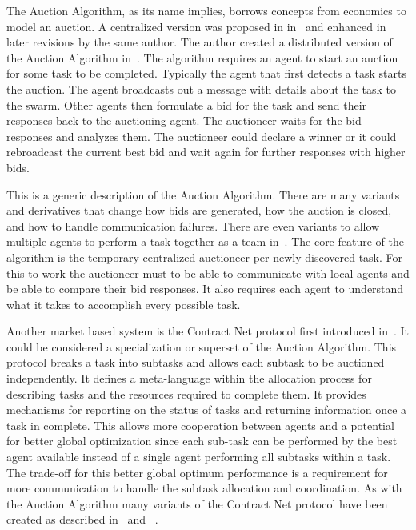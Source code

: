 The Auction Algorithm, as its name implies, borrows concepts from economics to model an auction.  A centralized version was proposed in in~\cite{auction_derive} and enhanced in later revisions by the same author.  The author created a distributed version of the Auction Algorithm in~\cite{auction_parallel}.  The algorithm requires an agent to start an auction for some task to be completed.  Typically the agent that first detects a task starts the auction.  The agent broadcasts out a message with details about the task to the swarm.  Other agents then formulate a bid for the task and send their responses back to the auctioning agent.  The auctioneer waits for the bid responses and analyzes them.  The auctioneer could declare a winner or it could rebroadcast the current best bid and wait again for further responses with higher bids.  

This is a generic description of the Auction Algorithm.  There are many variants and derivatives that change how bids are generated, how the auction is closed, and how to handle communication failures.  There are even variants to allow multiple agents to perform a task together as a team in~\cite{auction_team}.  The core feature of the algorithm is the temporary centralized auctioneer per newly discovered task.  For this to work the auctioneer must to be able to communicate with local agents and be able to compare their bid responses.  It also requires each agent to understand what it takes to accomplish every possible task.

Another market based system is the Contract Net protocol first introduced in~\cite{contract_net}.  It could be considered a specialization or superset of the Auction Algorithm.  This protocol breaks a task into subtasks and allows each subtask to be auctioned independently. It defines a meta-language within the allocation process for describing tasks and the resources required to complete them.  It provides mechanisms for reporting on the status of tasks and returning information once a task in complete.  This allows more cooperation between agents and a potential for better global optimization since each sub-task can be performed by the best agent available instead of a single agent performing all subtasks within a task.  The trade-off for this better global optimum performance is a requirement for more communication to handle the subtask allocation and coordination.  As with the Auction Algorithm many variants of the Contract Net protocol have been created as described in~\cite{contract_survey} and ~\cite{contract_equity}.

